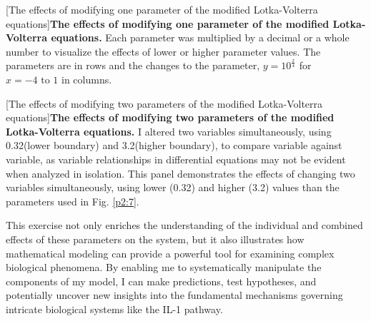 \begin{centering}
\captionsetup{parbox=none}
[The effects of modifying one parameter of the modified Lotka-Volterra equations]{\textbf{The effects of modifying one parameter of the modified Lotka-Volterra equations.} Each parameter was multiplied by a decimal or a whole number to visualize the effects of lower or higher parameter values. The parameters are in rows and the changes to the parameter, $y = 10^{\frac{x}{4}}$ for $x = -4 \text{ to } 1$ in columns.}
\label{p2:S7b}
\end{centering}



\begin{centering}

\captionsetup{parbox=none}
[The effects of modifying two parameters of the modified Lotka-Volterra equations]{\textbf{The effects of modifying two parameters of the modified Lotka-Volterra equations.} I altered two variables simultaneously, using 0.32\times (lower boundary) and 3.2\times (higher boundary), to compare variable against variable, as variable relationships in differential equations may not be evident when analyzed in isolation. This panel demonstrates the effects of changing two variables simultaneously, using lower (0.32\times) and higher (3.2\times) values than the parameters used in Fig. \ref{p2:7}.}
\label{p2:S7c}
\end{centering}

This exercise not only enriches the understanding of the individual and combined effects of these parameters on the system, but it also illustrates how mathematical modeling can provide a powerful tool for examining complex biological phenomena. By enabling me to systematically manipulate the components of my model, I can make predictions, test hypotheses, and potentially uncover new insights into the fundamental mechanisms governing intricate biological systems like the IL-1 pathway.

